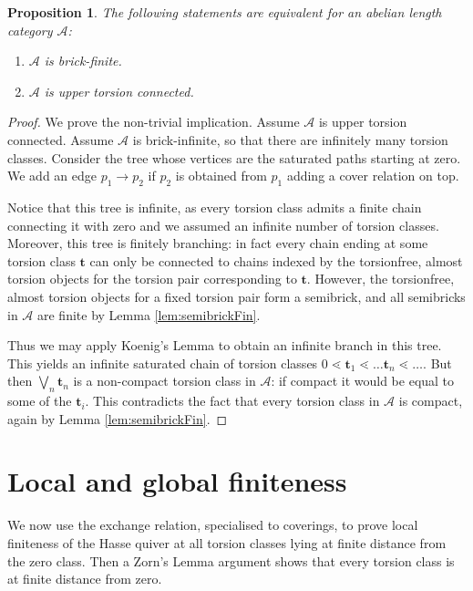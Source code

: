 \documentclass[11pt]{amsart}
\newtheorem{proposition}[theorem]{Proposition}
\theoremstyle{definition}
\newcommand{\A}{\mathcal A}
\begin{document}
\begin{proposition}
\label{prop:torsConnIsBrickFin}
The following statements are equivalent for an abelian length category \( \A \):
\begin{enumerate}
\item \( \A \) is brick-finite.
\item \( \A \) is upper torsion connected.
\end{enumerate}
\end{proposition}

\begin{proof}
We prove the non-trivial implication. Assume \( \A \) is upper torsion connected. Assume \( \A \) is brick-infinite, so that there are infinitely many torsion classes. Consider the tree whose vertices are the saturated paths starting at zero. We add an edge \( p_1 \to p_2 \) if \( p_2 \) is obtained from \( p_1 \) adding a cover relation on top. 

Notice that this tree is infinite, as every torsion class admits a finite chain connecting it with zero and we assumed an infinite number of torsion classes. Moreover, this tree is finitely branching: in fact every chain ending at some torsion class \( \mathbf{t} \) can only be connected to chains indexed by the torsionfree, almost torsion objects for the torsion pair corresponding to  \( \mathbf{t} \). However, the torsionfree, almost torsion objects for a fixed torsion pair form a semibrick, and all semibricks in \( \A \) are finite by Lemma \ref{lem:semibrickFin}.

Thus we may apply Koenig's Lemma to obtain an infinite branch in this tree. This yields an infinite saturated chain of torsion classes \( 0 \lessdot \mathbf{t}_1 \lessdot \dots \mathbf{t}_n \lessdot \dots \). But then \( \bigvee_n \mathbf{t}_n \) is a non-compact torsion class in \( \A \): if compact it would be equal to some of the \( \mathbf{t}_i \). This contradicts the fact that every torsion class in \( \A \) is compact, again by Lemma \ref{lem:semibrickFin}.
\end{proof}

\section{Local and global finiteness}

We now use the exchange relation, specialised to coverings, to prove local finiteness of the Hasse quiver at all torsion classes lying at finite distance from the zero class. Then a Zorn's Lemma argument shows that every torsion class is at finite distance from zero.
\end{document}
